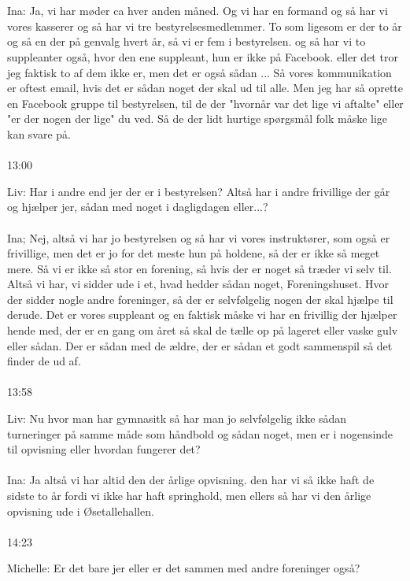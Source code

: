 \\\\
Ina: Ja, vi har møder ca hver anden måned. Og vi har en formand og så har vi vores kasserer og så har vi tre bestyrelsesmedlemmer. To som ligesom er der to år og så en der på genvalg hvert år, så vi er fem i bestyrelsen. og så har vi to suppleanter også,  hvor den ene suppleant, hun er ikke på Facebook. eller det tror jeg faktisk to af dem ikke er, men det er også sådan ... Så vores kommunikation er oftest email, hvis det er sådan noget der skal ud til alle. Men jeg har så oprette en Facebook gruppe til bestyrelsen, til de der "hvornår var det lige vi aftalte" eller "er der nogen der lige" du ved. Så de der lidt hurtige spørgsmål folk måske lige kan svare på.
\\\\
13:00
\par
Liv: Har i andre end jer der er i bestyrelsen? Altså har i andre frivillige der går og hjælper jer, sådan med noget i dagligdagen eller...?
\\\\
Ina; Nej, altså vi har jo bestyrelsen  og så  har vi vores instruktører, som også er frivillige, men det er jo for det meste hun på holdene, så  der er ikke så meget mere. Så  vi er ikke så stor en forening, så hvis der er noget så træder vi selv til. Altså  vi har, vi sidder ude i et, hvad hedder sådan noget, Foreningshuset. Hvor der sidder nogle andre foreninger, så der er selvfølgelig nogen der skal hjælpe til derude. Det er vores suppleant og en faktisk måske vi har en frivillig der hjælper hende med, der er en gang om året så skal de tælle op på lageret eller vaske gulv eller sådan. Der er sådan  med de ældre, der er sådan et godt sammenspil så det finder de ud af. 
\\\\
13:58
\par
Liv: Nu hvor man har gymnasitk så har man jo selvfølgelig ikke sådan turneringer på samme måde som håndbold og sådan noget, men er i nogensinde til opvisning eller hvordan fungerer det?
\\\\
Ina: Ja altså vi har altid den der årlige opvisning. den har vi så ikke haft de sidste to år fordi vi ikke har haft springhold, men ellers så har vi den årlige opvisning ude i Øsetallehallen. 
\\\\
14:23
\par
Michelle: Er det bare jer eller er det sammen med andre foreninger også?
